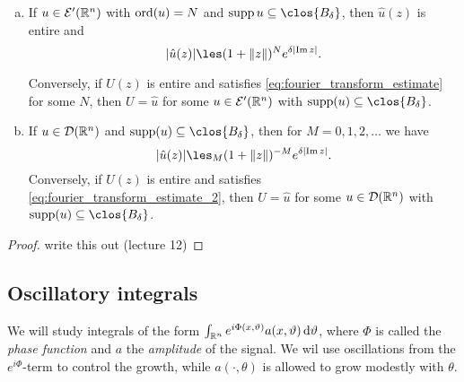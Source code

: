 \begin{theorem}
	\begin{enumerate}[(a)]
		\item If $u \in \mathcal E'(\mathbb R^n)$ with $\operatorname{ord}(u) = N$ and $\supp u \subseteq \clos{B_\delta}$, then $\hat u(z)$ is entire and
		\begin{equation} \label{eq:fourier_transform_estimate}
			\abs{\hat u(z)} \les (1 + \norm{z})^N e^{\delta \abs{\Im z}}. 
		\end{equation}
	
	Conversely, if $U(z)$ is entire and satisfies \cref{eq:fourier_transform_estimate} for some $N$, then $U = \hat u$ for some $u \in \mathcal E'(\mathbb R^n)$ with $\supp(u) \subseteq \clos{B_\delta}$. 
	
	\item If $u \in \mathcal D(\mathbb R^n)$ and $\supp(u) \subseteq \clos{B_\delta}$, then for $M = 0, 1, 2, \dotsc$ we have 
	\begin{equation}\label{eq:fourier_transform_estimate_2}
		\abs{\hat u(z)} \les_M (1 + \norm{z})^{-M} e^{\delta \abs{\Im z}}.
	\end{equation}
	Conversely, if $U(z)$ is entire and satisfies \cref{eq:fourier_transform_estimate_2}, then $U = \hat u$ for some $u \in \mathcal D(\mathbb R^n)$ with $\supp(u) \subseteq \clos{B_\delta}$. 
	\end{enumerate}
\end{theorem}

\begin{proof}
	\TODO write this out (lecture 12)
\end{proof}

\subsection{Oscillatory integrals}
We will study integrals of the form $\int_{\mathbb R^n} e^{i\Phi(x, \vartheta)} a(x, \vartheta) \dd{\vartheta}$, where $\Phi$ is called the \emph{phase function} and $a$ the \emph{amplitude} of the signal. We wil use oscillations from the $e^{i\Phi}$-term to control the growth, while $a(\cdot, \theta)$ is allowed to grow modestly with $\theta$. 

